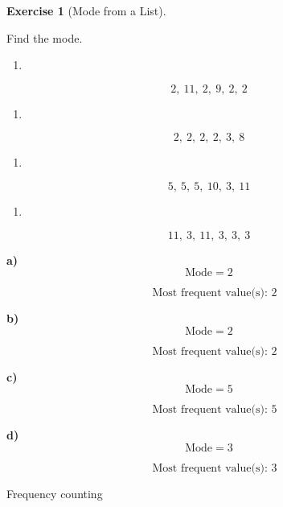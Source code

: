 \documentclass[
  letterpaper,
  DIV=11,
  numbers=noendperiod]{scrreprt}
\providecommand{\tightlist}{%
  \setlength{\itemsep}{0pt}\setlength{\parskip}{0pt}}
\theoremstyle{definition}
\newtheorem{exercise}{Exercise}[chapter]
\theoremstyle{remark}
\begin{document}
\begin{exercise}[Mode from a
List]\protect\hypertarget{exr-avg-3}{}\label{exr-avg-3}

Find the mode.

\begin{enumerate}
\def\labelenumi{\alph{enumi})}
\tightlist
\item
\end{enumerate}

\[2,\ 11,\ 2,\ 9,\ 2,\ 2\]

\begin{enumerate}
\def\labelenumi{\alph{enumi})}
\setcounter{enumi}{1}
\tightlist
\item
\end{enumerate}

\[2,\ 2,\ 2,\ 2,\ 3,\ 8\]

\begin{enumerate}
\def\labelenumi{\alph{enumi})}
\setcounter{enumi}{2}
\tightlist
\item
\end{enumerate}

\[5,\ 5,\ 5,\ 10,\ 3,\ 11\]

\begin{enumerate}
\def\labelenumi{\alph{enumi})}
\setcounter{enumi}{3}
\tightlist
\item
\end{enumerate}

\[11,\ 3,\ 11,\ 3,\ 3,\ 3\]

\begin{tcolorbox}[enhanced jigsaw, opacitybacktitle=0.6, coltitle=black, arc=.35mm, colframe=quarto-callout-tip-color-frame, colback=white, bottomrule=.15mm, left=2mm, colbacktitle=quarto-callout-tip-color!10!white, titlerule=0mm, opacityback=0, title=\textcolor{quarto-callout-tip-color}{\faLightbulb}\hspace{0.5em}{🔍 View Solution}, leftrule=.75mm, breakable, rightrule=.15mm, bottomtitle=1mm, toptitle=1mm, toprule=.15mm]

\textbf{a)} \[\text{Mode} = 2\]

\[\quad \text{Most frequent value(s): }2\]

\textbf{b)} \[\text{Mode} = 2\]

\[\quad \text{Most frequent value(s): }2\]

\textbf{c)} \[\text{Mode} = 5\]

\[\quad \text{Most frequent value(s): }5\]

\textbf{d)} \[\text{Mode} = 3\]

\[\quad \text{Most frequent value(s): }3\]

\end{tcolorbox}

{Frequency counting}

\end{exercise}
\end{document}
